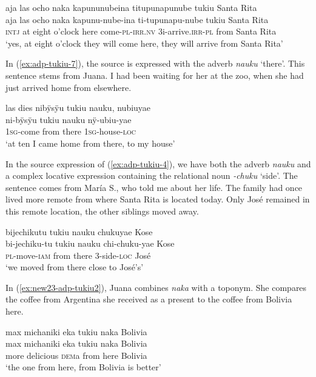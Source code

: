 \ea\label{ex:adp-tukiu-3}
\begingl
\glpreamble aja las ocho naka kapununubeina titupunapunube tukiu Santa Rita\\
\gla aja {las ocho} naka kapunu-nube-ina ti-tupunapu-nube tukiu {Santa Rita}\\
\glb \textsc{intj} {at eight o’clock} here come-\textsc{pl}-\textsc{irr.nv} 3i-arrive.\textsc{irr}-\textsc{pl} from {Santa Rita}\\
\glft ‘yes, at eight o’clock they will come here, they will arrive from Santa Rita’
\endgl
\trailingcitation{[jxx-p150920l.078]}
\xe
{}

In (\ref{ex:adp-tukiu-7}), the source is expressed with the adverb \textit{nauku} ‘there’. This sentence stems from Juana. I had been waiting for her at the zoo, when she had just arrived home from elsewhere.

\ea\label{ex:adp-tukiu-7}
\begingl
\glpreamble las dies nibÿsÿu tukiu nauku, nubiuyae\\
 ni-bÿsÿu tukiu nauku nÿ-ubiu-yae\\
 1\textsc{sg}-come from there 1\textsc{sg}-house-\textsc{loc}\\
\glft ‘at ten I came home from there, to my house’
\endgl
\trailingcitation{[jxx-p110923l-2.043]}
\xe

In the source expression of (\ref{ex:adp-tukiu-4}), we have both the adverb \textit{nauku} and a complex locative expression containing the relational noun \textit{-chuku} ‘side’. The sentence comes from María S., who told me about her life. The family had once lived more remote from where Santa Rita is located today. Only José remained in this remote location, the other siblings moved away. 

\ea\label{ex:adp-tukiu-4}
\begingl
\glpreamble bijechikutu tukiu nauku chukuyae Kose\\
\gla bi-jechiku-tu tukiu nauku chi-chuku-yae Kose\\
\textsc{pl}-move-\textsc{iam} from there 3-side-\textsc{loc} José\\
\glft ‘we moved from there close to José’s’
\endgl
\trailingcitation{[rxx-p181101l-2.257]}
\xe

In (\ref{ex:new23-adp-tukiu2}), Juana combines \textit{naka} with a toponym. She compares the coffee from Argentina she received as a present to the coffee from Bolivia here.

\ea\label{ex:new23-adp-tukiu2}
\begingl
\glpreamble max michaniki eka tukiu naka Bolivia\\
\gla max michaniki eka tukiu naka Bolivia\\
\glb more delicious \textsc{dem}a from here Bolivia\\
\glft ‘the one from here, from Bolivia is better’
\endgl
\trailingcitation{[jxx-e120430l-4.37]}
\xe

